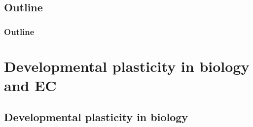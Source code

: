 \documentclass{beamer}
\begin{document}
\subsection*{Outline}

\begin{frame}
  \frametitle{Outline}
  \tableofcontents[hideallsubsections]
\end{frame}

\section[Developmental plasticity]{Developmental plasticity in biology and EC}

\subsection{Developmental plasticity in biology}
\end{document}
